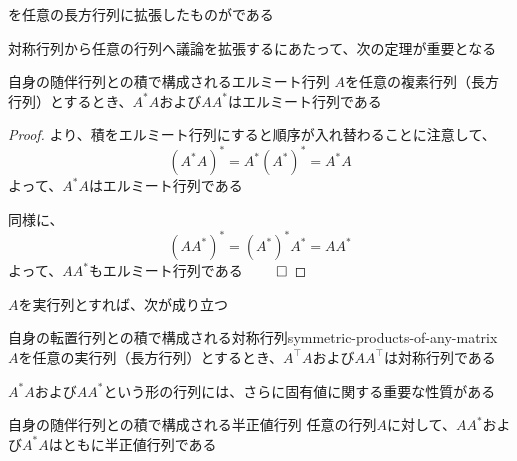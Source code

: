 \documentclass[../../../topic_linear-algebra]{subfiles}
\begin{document}
を任意の長方行列に拡張したものがである

\br

対称行列から任意の行列へ議論を拡張するにあたって、次の定理が重要となる

\begin{theorem*}{自身の随伴行列との積で構成されるエルミート行列}
  $A$を任意の複素行列（長方行列）とするとき、$A^* A$および$AA^*$はエルミート行列である
\end{theorem*}

\begin{proof}
  より、積をエルミート行列にすると順序が入れ替わることに注意して、
  \begin{equation*}
    (A^* A)^* = A^* (A^*)^* = A^* A
  \end{equation*}
  よって、$A^* A$はエルミート行列である

  \br

  同様に、
  \begin{equation*}
    (AA^*)^* = (A^*)^* A^* = AA^*
  \end{equation*}
  よって、$AA^*$もエルミート行列である $\qed$
\end{proof}

\br

$A$を実行列とすれば、次が成り立つ

\begin{theorem}{自身の転置行列との積で構成される対称行列}{symmetric-products-of-any-matrix}
  $A$を任意の実行列（長方行列）とするとき、$A^\top A$および$AA^\top$は対称行列である
\end{theorem}

\sectionline

$A^* A$および$AA^*$という形の行列には、さらに固有値に関する重要な性質がある

\begin{theorem*}{自身の随伴行列との積で構成される半正値行列}
  任意の行列$A$に対して、$AA^*$および$A^*A$はともに半正値行列である
\end{theorem*}
\end{document}
